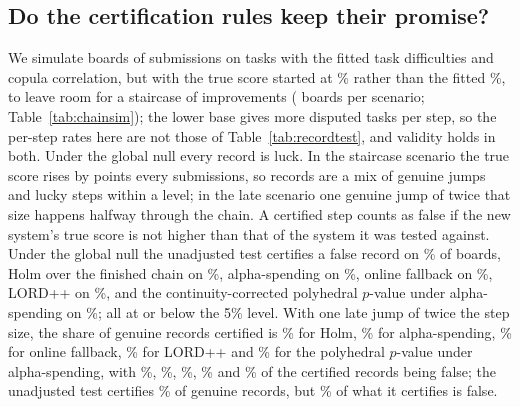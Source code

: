 \documentclass[11pt]{article}
\begin{document}
\begin{table}[t]
\centering\small
\resizebox{\textwidth}{!}{}
\caption{How often the record test wrongly rejects among record steps, with the simulation model fitted to each of four boards (their own task difficulties, base score and copula correlation). Global null: \NumSimK{} equally able systems in sequence, averaged over the chain. Selected-step null: equally able holder and challenger, challenger scored higher. A correct test rejects 5\% at the 5\% level. Last column: how often the selective test catches a gap equal to the formula's minimum detectable difference, target 0.80.}
\label{tab:recordtest}
\end{table}

\subsection{Do the certification rules keep their promise?}
We simulate boards of \NumChainK{} submissions on \NumChainT{} tasks with the fitted task difficulties and copula correlation, but with the true score started at \NumChainBase\% rather than the fitted \NumSimBase\%, to leave room for a staircase of improvements (\NumChainR{} boards per scenario; Table~\ref{tab:chainsim}); the lower base gives more disputed tasks per step, so the per-step rates here are not those of Table~\ref{tab:recordtest}, and validity holds in both.
Under the global null every record is luck.
In the staircase scenario the true score rises by \NumChainStep{} points every \NumChainPeriod{} submissions, so records are a mix of genuine jumps and lucky steps within a level; in the late scenario one genuine jump of twice that size happens halfway through the chain.
A certified step counts as false if the new system's true score is not higher than that of the system it was tested against.
Under the global null the unadjusted test certifies a false record on \NumChainNullUnadjFwer\% of boards, Holm over the finished chain on \NumChainNullHolmFwer\%, alpha-spending on \NumChainNullSpendFwer\%, online fallback on \NumChainNullFallFwer\%, LORD++ on \NumChainNullLordFwer\%, and the continuity-corrected polyhedral $p$-value under alpha-spending on \NumChainNullSpendPolyFwer\%; all at or below the 5\% level.
With one late jump of twice the step size, the share of genuine records certified is \NumChainLateHolmPower\% for Holm, \NumChainLateSpendPower\% for alpha-spending, \NumChainLateFallPower\% for online fallback, \NumChainLateLordPower\% for LORD++ and \NumChainLateSpendPolyPower\% for the polyhedral $p$-value under alpha-spending, with \NumChainLateHolmFdr\%, \NumChainLateSpendFdr\%, \NumChainLateFallFdr\%, \NumChainLateLordFdr\% and \NumChainLateSpendPolyFdr\% of the certified records being false; the unadjusted test certifies \NumChainLateUnadjPower\% of genuine records, but \NumChainLateUnadjFdr\% of what it certifies is false.
\end{document}
